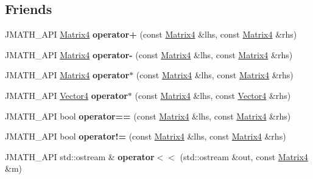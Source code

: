 \subsection*{Friends}
\begin{DoxyCompactItemize}
\item 
\hypertarget{class_matrix4_a8a8369827f82b74e344b0c38f45b0a06}{J\+M\+A\+T\+H\+\_\+\+A\+P\+I \hyperlink{class_matrix4}{Matrix4} {\bfseries operator+} (const \hyperlink{class_matrix4}{Matrix4} \&lhs, const \hyperlink{class_matrix4}{Matrix4} \&rhs)}\label{class_matrix4_a8a8369827f82b74e344b0c38f45b0a06}

\item 
\hypertarget{class_matrix4_ac2d39ddfabd28f5ff5343c4b933109aa}{J\+M\+A\+T\+H\+\_\+\+A\+P\+I \hyperlink{class_matrix4}{Matrix4} {\bfseries operator-\/} (const \hyperlink{class_matrix4}{Matrix4} \&lhs, const \hyperlink{class_matrix4}{Matrix4} \&rhs)}\label{class_matrix4_ac2d39ddfabd28f5ff5343c4b933109aa}

\item 
\hypertarget{class_matrix4_a000713a7ba7cc0442c6d40121f8b6901}{J\+M\+A\+T\+H\+\_\+\+A\+P\+I \hyperlink{class_matrix4}{Matrix4} {\bfseries operator$\ast$} (const \hyperlink{class_matrix4}{Matrix4} \&lhs, const \hyperlink{class_matrix4}{Matrix4} \&rhs)}\label{class_matrix4_a000713a7ba7cc0442c6d40121f8b6901}

\item 
\hypertarget{class_matrix4_ac826c4bbaee1c40c601a1a8382941236}{J\+M\+A\+T\+H\+\_\+\+A\+P\+I \hyperlink{class_vector4}{Vector4} {\bfseries operator$\ast$} (const \hyperlink{class_matrix4}{Matrix4} \&lhs, const \hyperlink{class_vector4}{Vector4} \&rhs)}\label{class_matrix4_ac826c4bbaee1c40c601a1a8382941236}

\item 
\hypertarget{class_matrix4_ae0399e500c196b3374a5e9a5bca11b8f}{J\+M\+A\+T\+H\+\_\+\+A\+P\+I bool {\bfseries operator==} (const \hyperlink{class_matrix4}{Matrix4} \&lhs, const \hyperlink{class_matrix4}{Matrix4} \&rhs)}\label{class_matrix4_ae0399e500c196b3374a5e9a5bca11b8f}

\item 
\hypertarget{class_matrix4_a11b6871324a44ca5de591dbfba939674}{J\+M\+A\+T\+H\+\_\+\+A\+P\+I bool {\bfseries operator!=} (const \hyperlink{class_matrix4}{Matrix4} \&lhs, const \hyperlink{class_matrix4}{Matrix4} \&rhs)}\label{class_matrix4_a11b6871324a44ca5de591dbfba939674}

\item 
\hypertarget{class_matrix4_ab2200cce8783581bcddd7f6f37881d12}{J\+M\+A\+T\+H\+\_\+\+A\+P\+I std\+::ostream \& {\bfseries operator$<$$<$} (std\+::ostream \&out, const \hyperlink{class_matrix4}{Matrix4} \&m)}\label{class_matrix4_ab2200cce8783581bcddd7f6f37881d12}

\end{DoxyCompactItemize}


